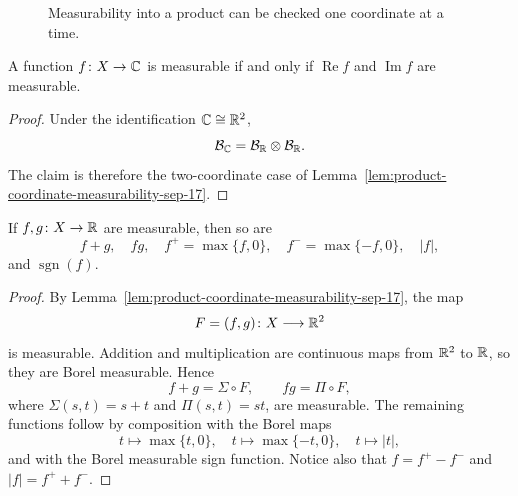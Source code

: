 \begin{figure}[htbp]
  \centering
  \caption{Measurability into a product can be checked one coordinate
    at a time.}
  \label{fig:product-measurability-sep-17}
\end{figure}

\begin{corollary}\label{cor:complex-coordinate-measurability-sep-17}
  A function $f\colon X\to\mathbb{C}$ is measurable if and only if
  $\operatorname{Re}f$ and $\operatorname{Im}f$ are measurable.
\end{corollary}

\begin{proof}
  Under the identification $\mathbb{C}\cong\mathbb{R}^2$,
  \[
    \mathcal B_{\mathbb{C}}
    =\mathcal B_{\mathbb{R}}\otimes\mathcal B_{\mathbb{R}}.
  \]
  The claim is therefore the two-coordinate case of
  Lemma~\ref{lem:product-coordinate-measurability-sep-17}.
\end{proof}

\begin{proposition}
  \label{prop:measurable-function-operations-sep-17}
  If $f,g\colon X\to\mathbb{R}$ are measurable, then so are
  \[
    f+g,\quad fg,\quad f^+=\max\{f,0\},\quad
    f^-=\max\{-f,0\},\quad |f|,
  \]
  and $\operatorname{sgn}(f)$.
\end{proposition}

\begin{proof}
  By Lemma~\ref{lem:product-coordinate-measurability-sep-17}, the map
  \[
    F=(f,g)\colon X\longrightarrow\mathbb{R}^2
  \]
  is measurable.  Addition and multiplication are continuous maps from
  $\mathbb{R}^2$ to $\mathbb{R}$, so they are Borel measurable.  Hence
  \[
    f+g=\Sigma\circ F,
    \qquad
    fg=\Pi\circ F,
  \]
  where $\Sigma(s,t)=s+t$ and $\Pi(s,t)=st$, are measurable.  The
  remaining functions follow by composition with the Borel maps
  \[
    t\longmapsto\max\{t,0\},\quad
    t\longmapsto\max\{-t,0\},\quad
    t\longmapsto |t|,
  \]
  and with the Borel measurable sign function.  Notice also that
  $f=f^+-f^-$ and $|f|=f^++f^-$.
\end{proof}

